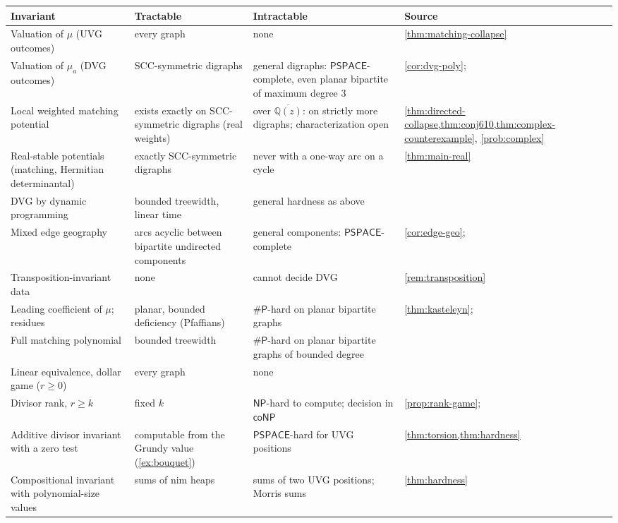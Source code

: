 \documentclass[11pt]{amsart}
\theoremstyle{plain}
\theoremstyle{definition}
\theoremstyle{remark}
\numberwithin{equation}{section}
\newcommand{\QQ}{\mathbb{Q}}
\newcommand{\Qzbar}{\overline{\QQ(z)}}
\newcommand{\cls}[1]{\mathsf{#1}}
\newcommand{\PSPACE}{\cls{PSPACE}}
\newcommand{\NP}{\cls{NP}}
\newcommand{\coNP}{\cls{coNP}}
\newcommand{\sharpP}{\#\cls{P}}
\begin{document}
\begin{center}
\small
\begin{longtable}{@{}L{0.24}L{0.19}L{0.26}L{0.21}@{}}
\toprule
Invariant & Tractable & Intractable & Source\\ \midrule\endhead
Valuation of $\mu$ (UVG outcomes) & every graph & none & \cref{thm:matching-collapse}\\
Valuation of $\mu_a$ (DVG outcomes) & SCC-symmetric digraphs & general digraphs: $\PSPACE$-complete, even planar bipartite of maximum degree $3$ & \cref{cor:dvg-poly}; \cite{LichtensteinSipser}\\
Local weighted matching potential & exists exactly on SCC-symmetric digraphs (real weights) & over $\Qzbar$: on strictly more digraphs; characterization open & \cref{thm:directed-collapse,thm:conj610,thm:complex-counterexample}, \cref{prob:complex}\\
Real-stable potentials (matching, Hermitian determinantal) & exactly SCC-symmetric digraphs & never with a one-way arc on a cycle & \cref{thm:main-real}\\
DVG by dynamic programming & bounded treewidth, linear time & general hardness as above & \cite{Bodlaender}\\
Mixed edge geography & arcs acyclic between bipartite undirected components & general components: $\PSPACE$-complete & \cref{cor:edge-geo}; \cite{FSU}\\
Transposition-invariant data & none & cannot decide DVG & \cref{rem:transposition}\\
Leading coefficient of $\mu$; residues & planar, bounded deficiency (Pfaffians) & $\sharpP$-hard on planar bipartite graphs & \cref{thm:kasteleyn}; \cite{Vadhan}\\
Full matching polynomial & bounded treewidth & $\sharpP$-hard on planar bipartite graphs of bounded degree & \cite{Jerrum,Vadhan}\\
Linear equivalence, dollar game ($r\ge0$) & every graph & none & \cite{BakerShokrieh}\\
Divisor rank, $r\ge k$ & fixed $k$ & $\NP$-hard to compute; decision in $\coNP$ & \cref{prop:rank-game}; \cite{KissToth}\\
Additive divisor invariant with a zero test & computable from the Grundy value (\cref{ex:bouquet}) & $\PSPACE$-hard for UVG positions & \cref{thm:torsion,thm:hardness}\\
Compositional invariant with polynomial-size values & sums of nim heaps & sums of two UVG positions; Morris sums & \cref{thm:hardness}\\
\bottomrule
\end{longtable}
\end{center}
\end{document}
